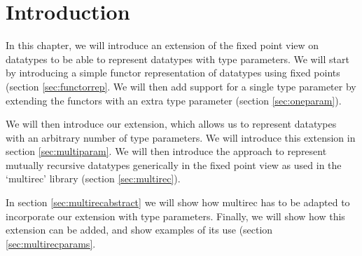 \section{Introduction}


In this chapter, we will introduce an extension of the fixed point
view on datatypes to be able to represent datatypes with type
parameters. We will start by introducing a simple functor
representation of datatypes using fixed points (section
\ref{sec:functorrep}. We will then add support for a single type
parameter by extending the functors with an extra type parameter
(section \ref{sec:oneparam}).

We will then introduce our extension, which allows us to represent
datatypes with an arbitrary number of type parameters. We will
introduce this extension in section \ref{sec:multiparam}. We will then
introduce the approach to represent mutually recursive datatypes
generically in the fixed point view \cite{multirec} as used in the
`multirec' library (section \ref{sec:multirec}).

In section \ref{sec:multirecabstract} we will show how multirec has to
be adapted to incorporate our extension with type parameters. Finally,
we will show how this extension can be added, and show examples of its
use (section \ref{sec:multirecparams}.
